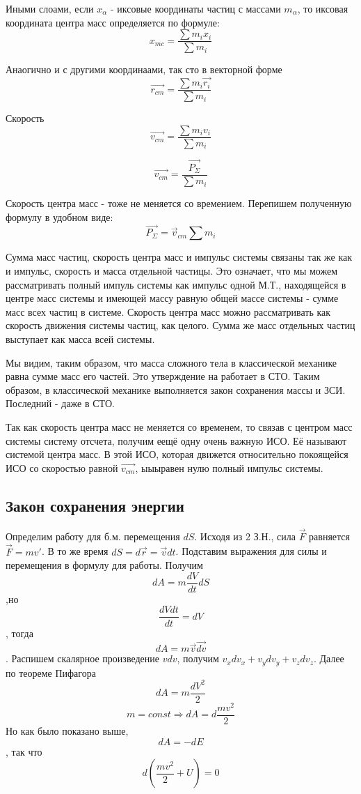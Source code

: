 \documentclass{article}
\begin{document}
Иными слоами, если $x_\alpha$ - иксовые координаты частиц с массами $m_\alpha$, то иксовая координата центра масс определяется по формуле:
$$x_{mc} = \frac{\sum m_i x_i}{\sum m_i}$$

Анаогично и с другими координаами, так сто в векторной форме $$\vec {r_{cm}} = \frac{\sum{m_i\vec{r_i}}}{\sum m_i}$$

Скорость 
$$\vec {v_{cm}} = \frac{\sum{m_i v_i}}{\sum m_i}$$

$$\vec{v_{cm}} = \frac{\vec{P_\Sigma}}{\sum m_i}$$

Скорость центра масс - тоже не меняется со времением. Перепишем полученную формулу в удобном виде:
$$\vec{P_\Sigma} = \vec v_{cm}\sum m_i$$

Сумма масс частиц, скорость центра масс и импульс системы связаны так же как и импульс, скорость и масса отдельной частицы. Это означает, что мы можем рассматривать полный импуль системы как импульс одной М.Т., находящейся в центре масс системы и имеющей массу равную общей массе системы - сумме масс всех частиц в системе. Скорость центра масс можно рассматривать как скорость движения системы частиц, как целого. Сумма же масс отдельных частиц выступает как масса всей системы.

Мы видим, таким образом, что масса сложного тела в классической механике равна сумме масс его частей. Это утверждение на работает в СТО. Таким образом, в классической механике выполняется закон сохранения массы и ЗСИ. Последний - даже в СТО.

Так как скорость центра масс не меняется со временем, то связав с центром масс системы систему отсчета, получим еещё одну очень важную ИСО. Её называют системой центра масс. В этой ИСО, которая движется относительно покоящейся ИСО со скоростью равной $\vec{v_{cm}}$, ыыыравен нулю полный импульс системы.

\subsection{Закон сохранения энергии}

Определим работу для б.м. перемещения $dS$. Исходя из 2 З.Н., сила $\vec F$ равняется $\vec F = mv'$. В то же время $dS = d\vec r = \vec vdt$. Подставим выражения для силы и перемещения в формулу для работы. Получим
$$dA = m\frac{dV}{dt}dS$$,но $$\frac{dV dt}{dt} = dV$$, тогда $$dA = m\vec{v}\vec{dv}$$. Распишем скалярное произведение $vdv$, получим $v_xdv_x + v_ydv_y + v_zdv_z$. Далее по теореме Пифагора
$$dA = m\frac{dV^2}{2}$$
$$m=const \Rightarrow dA = d \frac{mv^2}{2}$$
Но как было показано выше, $$dA = -dE$$, так что $$d(\frac{mv^2}{2}+U) = 0$$
\end{document}
